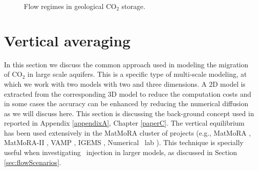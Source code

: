 \begin{figure}[tbp!]%
  \hspace{0.2cm}
  \hspace{0.1cm}
  \caption{Flow regimes in geological $\mbox{CO}_2$ storage.}
 \label{fig:Frc}
\end{figure}


\section{Vertical averaging}

In this section we discuss the common approach used in modeling the migration
of $\mbox{CO}_2$ in large scale aquifers. This is a specific type of multi-scale
modeling, at which we work with two models with two and three
dimensions. A $2\mbox{D}$ model is extracted from the corresponding $3\mbox{D}$ 
model to reduce the computation costs and in some cases the accuracy can be
enhanced by reducing the numerical diffusion as we will discuss here. This section is discussing the back-ground concept used in \cite{moll2011field} reported in Appendix \ref{appendixA}, Chapter \ref{paperC}. The vertical equilibrium has been used extensively in the MatMoRA cluster of projects (e.g., MatMoRA \cite{matmora1}, MatMoRA-II \cite{matmora2}, VAMP \cite{vamp}, IGEMS \cite{syversveenstudy}, Numerical \coo\ lab \cite{coolab}). This technique is specially useful when investigating \coo\ injection in larger models, as discussed in Section \ref{sec:flowScenarios}. 

